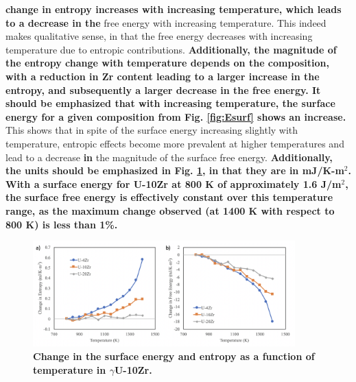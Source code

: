 \documentclass[review]{elsarticle}
\providecommand{\DIFaddtex}[1]{{\bf #1}} %
\providecommand{\DIFdeltex}[1]{} %
\providecommand{\DIFaddbegin}{\protect\color{blue}} %
\providecommand{\DIFaddend}{\protect\color{black}} %
\providecommand{\DIFdelbegin}{\protect\color{red}} %
\providecommand{\DIFdelend}{\protect\color{black}} %
\providecommand{\DIFaddFL}[1]{\DIFadd{#1}} %
\providecommand{\DIFadd}[1]{\texorpdfstring{\DIFaddtex{#1}}{#1}} %
\providecommand{\DIFdel}[1]{\texorpdfstring{\DIFdeltex{#1}}{}} %
\newcommand{\DIFscaledelfig}{0.5}
\newlength{\DIFdelgraphicswidth} %
\newlength{\DIFdelgraphicsheight} %
\newcommand{\DIFaddincludegraphics}[2][]{{\color{blue}\fbox{\DIFOincludegraphics[#1]{#2}}}} %
\newcommand{\DIFdelincludegraphics}[2][]{%
\sbox{\DIFdelgraphicsbox}{\DIFOincludegraphics[#1]{#2}}%
\settoboxwidth{\DIFdelgraphicswidth}{\DIFdelgraphicsbox} %
\settoboxtotalheight{\DIFdelgraphicsheight}{\DIFdelgraphicsbox} %
\scalebox{\DIFscaledelfig}{%
\parbox[b]{\DIFdelgraphicswidth}{\usebox{\DIFdelgraphicsbox}\\[-\baselineskip] \rule{\DIFdelgraphicswidth}{0em}}\llap{\resizebox{\DIFdelgraphicswidth}{\DIFdelgraphicsheight}{%
\setlength{\unitlength}{\DIFdelgraphicswidth}%
\begin{picture}(1,1)%
\thicklines\linethickness{2pt} %
{\color[rgb]{1,0,0}\put(0,0){\framebox(1,1){}}}%
{\color[rgb]{1,0,0}\put(0,0){\line( 1,1){1}}}%
{\color[rgb]{1,0,0}\put(0,1){\line(1,-1){1}}}%
\end{picture}%
}\hspace*{3pt}}} %
} %
\DeclareRobustCommand{\DIFaddbegin}{\DIFOaddbegin \let\includegraphics\DIFaddincludegraphics} %
\DeclareRobustCommand{\DIFaddend}{\DIFOaddend \let\includegraphics\DIFOincludegraphics} %
\DeclareRobustCommand{\DIFdelbegin}{\DIFOdelbegin \let\includegraphics\DIFdelincludegraphics} %
\DeclareRobustCommand{\DIFdelend}{\DIFOaddend \let\includegraphics\DIFOincludegraphics} %
\begin{document}
\DIFdel{The subsequent surface free energy as a function of temperatureis shown in Fig. \ref{fig:free}.  Due to the increasing entropy, a trend can be seen pointing towards a slight decrease in }\DIFdelend \DIFaddbegin \DIFadd{change in entropy increases with increasing temperature, which leads to a decrease in the }\DIFaddend free energy with increasing temperature. This indeed makes qualitative sense, in that the free energy decreases with increasing temperature due to entropic contributions. \DIFaddbegin \DIFadd{Additionally, the magnitude of the entropy change with temperature depends on the composition, with a reduction in Zr content leading to a larger increase in the entropy, and subsequently a larger decrease in the free energy. It should be emphasized that with increasing temperature, the surface energy for a given composition from Fig. \ref{fig:Esurf} shows an increase. }\DIFaddend This shows that in spite of the surface energy increasing slightly with temperature, entropic effects become more prevalent at higher temperatures and lead to a decrease \DIFaddbegin \DIFadd{in }\DIFaddend the magnitude of the surface free energy. \DIFdelbegin \DIFdel{To make this }\DIFdelend \DIFaddbegin \DIFadd{Additionally, the units should be emphasized in Fig. \ref{fig:free}, in that they are in mJ/K-m$^2$. With a surface energy for U-10Zr at 800 K of approximately 1.6 J/m$^2$, the surface free energy is effectively constant over this temperature range, as the maximum change observed (at 1400 K with respect to 800 K) is less than 1\%. 
}

\begin{figure}[!htp]
\begin{center}
\includegraphics[width=0.9\textwidth]{9_entropy_energy}
\end{center}
\caption{\DIFaddFL{Change in the surface energy and entropy as a function of temperature in $\gamma$U-10Zr.}}
\label{fig:free}
\end{figure}
\end{document}
